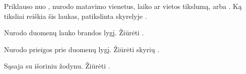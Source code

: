 \documentclass[letterpaper,10pt,lithuanian]{sphinxmanual}
\begin{document}
\begin{fulllineitems}
\label{\detokenize{dimensijos:property.ref}}
\pysigstartsignatures
\pysigline
{}
\pysigstopsignatures
\sphinxAtStartPar
Priklauso nuo , nurodo matavimo vienetus, laiko ar vietos
tikslumą, {\hyperref[\detokenize{dimensijos:enum}]{}} arba {\hyperref[\detokenize{identifikatoriai:rysiai}]{}}. Ką tiksliai reiškia šis laukas, patikslinta skyrelyje
{\hyperref[\detokenize{tipai:duomenu-tipai}]{}}.

\end{fulllineitems}


\begin{fulllineitems}
\label{\detokenize{dimensijos:property.level}}
\pysigstartsignatures
\pysigline
{}
\pysigstopsignatures
\sphinxAtStartPar
Nurodo duomenų lauko brandos lygį. Žiūrėti {\hyperref[\detokenize{branda:level}]{}}.

\end{fulllineitems}


\begin{fulllineitems}
\label{\detokenize{dimensijos:property.access}}
\pysigstartsignatures
\pysigline
{}
\pysigstopsignatures
\sphinxAtStartPar
Nurodo prieigos prie duomenų lygį. Žiūrėti skyrių {\hyperref[\detokenize{prieiga:access}]{}}.

\end{fulllineitems}


\begin{fulllineitems}
\label{\detokenize{dimensijos:property.uri}}
\pysigstartsignatures
\pysigline
{}
\pysigstopsignatures
\sphinxAtStartPar
Sąsaja su išoriniu žodynu. Žiūrėti {\hyperref[\detokenize{zodynai:vocab}]{}}.

\end{fulllineitems}
\end{document}
